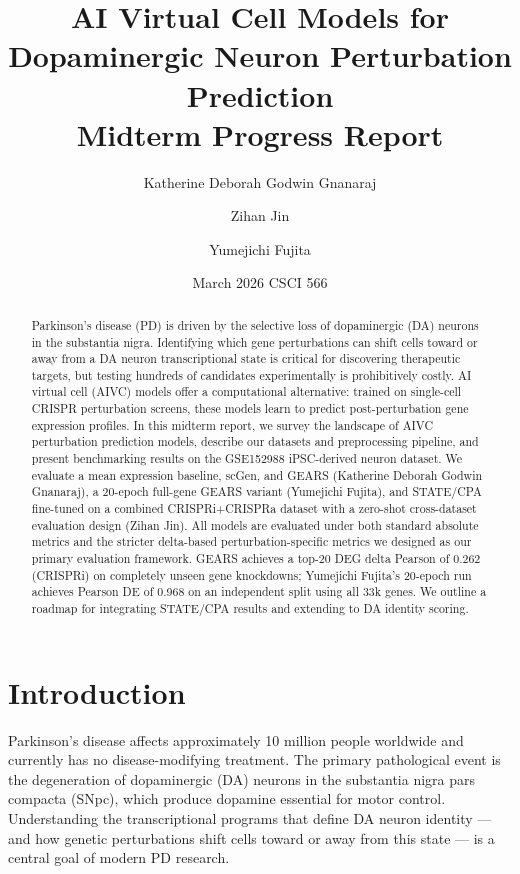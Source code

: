 \documentclass[11pt,letterpaper]{article}
\title{\textbf{AI Virtual Cell Models for Dopaminergic Neuron Perturbation Prediction}\\
\large Midterm Progress Report}
\author{Katherine Deborah Godwin Gnanaraj \and Zihan Jin \and Yumejichi Fujita}
\date{March 2026 \quad CSCI 566}
\begin{document}
\maketitle

\begin{abstract}
Parkinson's disease (PD) is driven by the selective loss of dopaminergic (DA) neurons in the
substantia nigra. Identifying which gene perturbations can shift cells toward or away from a DA
neuron transcriptional state is critical for discovering therapeutic targets, but testing hundreds
of candidates experimentally is prohibitively costly. AI virtual cell (AIVC) models offer a
computational alternative: trained on single-cell CRISPR perturbation screens, these models
learn to predict post-perturbation gene expression profiles. In this midterm report, we survey
the landscape of AIVC perturbation prediction models, describe our datasets and preprocessing
pipeline, and present benchmarking results on the GSE152988 iPSC-derived neuron dataset. We
evaluate a mean expression baseline, scGen, and GEARS (Katherine Deborah Godwin Gnanaraj), a
20-epoch full-gene GEARS variant (Yumejichi Fujita), and STATE/CPA fine-tuned on a combined
CRISPRi+CRISPRa dataset with a zero-shot cross-dataset evaluation design (Zihan Jin). All
models are evaluated under both standard absolute metrics and the stricter delta-based
perturbation-specific metrics we designed as our primary evaluation framework. GEARS achieves a
top-20 DEG delta Pearson of 0.262 (CRISPRi) on completely unseen gene knockdowns; Yumejichi
Fujita's 20-epoch run achieves Pearson DE of 0.968 on an independent split using all 33k genes.
We outline a roadmap for integrating STATE/CPA results and extending to DA identity scoring.
\end{abstract}

\section{Introduction}

Parkinson's disease affects approximately 10 million people worldwide and currently has no
disease-modifying treatment. The primary pathological event is the degeneration of dopaminergic
(DA) neurons in the substantia nigra pars compacta (SNpc), which produce dopamine essential for
motor control. Understanding the transcriptional programs that define DA neuron identity --- and
how genetic perturbations shift cells toward or away from this state --- is a central goal of
modern PD research.
\end{document}
